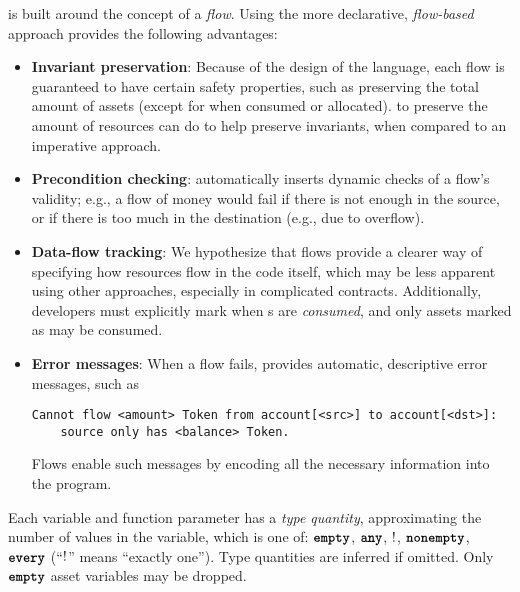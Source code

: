 \documentclass[nonacm, dvipsnames, sigconf]{acmart}
\begin{document}
\langName is built around the concept of a \emph{flow}.
Using the more declarative, \emph{flow-based} approach provides the following advantages:
\begin{itemize}
    \item \textbf{Invariant preservation}: Because of the design of the language, each flow is guaranteed to have certain safety properties, such as preserving the total amount of assets (except for when consumed or allocated).
        to preserve the amount of resources can do  to help preserve invariants, when compared to an imperative approach.
    \item \textbf{Precondition checking}: \langName automatically inserts dynamic checks of a flow's validity; e.g., a flow of money would fail if there is not enough in the source, or if there is too much in the destination (e.g., due to overflow).
    \item \textbf{Data-flow tracking}: We hypothesize that flows provide a clearer way of specifying how resources flow in the code itself, which may be less apparent using other approaches, especially in complicated contracts.
        Additionally, developers must explicitly mark when \assetTxt{}s are \emph{consumed}, and only assets marked as  may be consumed.
    \item \textbf{Error messages}: When a flow fails, \langName provides automatic, descriptive error messages, such as
\begin{lstlisting}[numbers=none, basicstyle=\small\ttfamily, xleftmargin=-5.0ex]
Cannot flow <amount> Token from account[<src>] to account[<dst>]:
    source only has <balance> Token.
\end{lstlisting}
        Flows enable such messages by encoding all the necessary information into the program.
\end{itemize}

Each variable and function parameter has a \emph{type quantity}, approximating the number of values in the variable, which is one of: $\textbf{\texttt{empty}}$, $\textbf{\texttt{any}}$, $!$, $\textbf{\texttt{nonempty}}$, $\textbf{\texttt{every}}$ (``$!$'' means ``exactly one'').
Type quantities are inferred if omitted.
Only $\textbf{\texttt{empty}}$ asset variables may be dropped.
\end{document}
